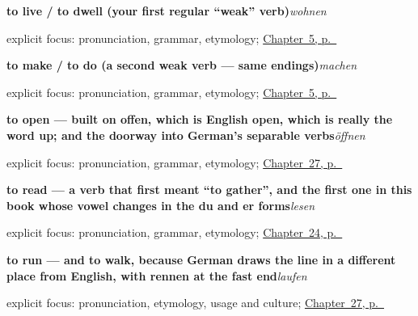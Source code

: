 \noindent\begin{minipage}[t]{\linewidth}
\raggedright
\textbf{to live / to dwell (your first regular \textquotedblleft{}weak\textquotedblright{} verb)}\enspace\emph{wohnen}\par
\footnotesize explicit focus: pronunciation, grammar, etymology; \hyperref[ch:first-verbs]{Chapter~5, p.~\pageref*{ch:first-verbs}}
\end{minipage}\par\smallskip

\noindent\begin{minipage}[t]{\linewidth}
\raggedright
\textbf{to make / to do (a second weak verb — same endings)}\enspace\emph{machen}\par
\footnotesize explicit focus: pronunciation, grammar, etymology; \hyperref[ch:first-verbs]{Chapter~5, p.~\pageref*{ch:first-verbs}}
\end{minipage}\par\smallskip

\noindent\begin{minipage}[t]{\linewidth}
\raggedright
\textbf{to open — built on offen, which is English open, which is really the word up; and the doorway into German's separable verbs}\enspace\emph{öffnen}\par
\footnotesize explicit focus: pronunciation, grammar, etymology; \hyperref[ch:ge-moving-verbs]{Chapter~27, p.~\pageref*{ch:ge-moving-verbs}}
\end{minipage}\par\smallskip

\noindent\begin{minipage}[t]{\linewidth}
\raggedright
\textbf{to read — a verb that first meant \textquotedblleft{}to gather\textquotedblright{}, and the first one in this book whose vowel changes in the du and er forms}\enspace\emph{lesen}\par
\footnotesize explicit focus: pronunciation, grammar, etymology; \hyperref[ch:ge-mind-verbs]{Chapter~24, p.~\pageref*{ch:ge-mind-verbs}}
\end{minipage}\par\smallskip

\noindent\begin{minipage}[t]{\linewidth}
\raggedright
\textbf{to run — and to walk, because German draws the line in a different place from English, with rennen at the fast end}\enspace\emph{laufen}\par
\footnotesize explicit focus: pronunciation, etymology, usage and culture; \hyperref[ch:ge-moving-verbs]{Chapter~27, p.~\pageref*{ch:ge-moving-verbs}}
\end{minipage}\par\smallskip

